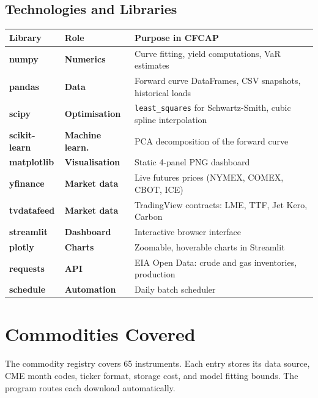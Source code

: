 \documentclass[11pt,a4paper]{article}
\begin{document}
\subsection{Technologies and Libraries}

\begin{center}
\begin{tabularx}{\textwidth}{>{\ttfamily\bfseries}l >{\bfseries}l X}
\toprule
\normalfont\textbf{Library} & Role & Purpose in CFCAP \\
\midrule
numpy        & Numerics      & Curve fitting, yield computations, VaR estimates \\
pandas       & Data          & Forward curve DataFrames, CSV snapshots, historical loads \\
scipy        & Optimisation  & \texttt{least\_squares} for Schwartz-Smith, cubic spline interpolation \\
scikit-learn & Machine learn.& PCA decomposition of the forward curve \\
matplotlib   & Visualisation & Static 4-panel PNG dashboard \\
yfinance     & Market data   & Live futures prices (NYMEX, COMEX, CBOT, ICE) \\
tvdatafeed   & Market data   & TradingView contracts: LME, TTF, Jet Kero, Carbon \\
streamlit    & Dashboard     & Interactive browser interface \\
plotly       & Charts        & Zoomable, hoverable charts in Streamlit \\
requests     & API           & EIA Open Data: crude and gas inventories, production \\
schedule     & Automation    & Daily batch scheduler \\
\bottomrule
\end{tabularx}
\end{center}

\section{Commodities Covered}

The commodity registry covers 65 instruments. Each entry stores its data source, CME month codes, ticker format, storage cost, and model fitting bounds. The program routes each download automatically.
\end{document}
